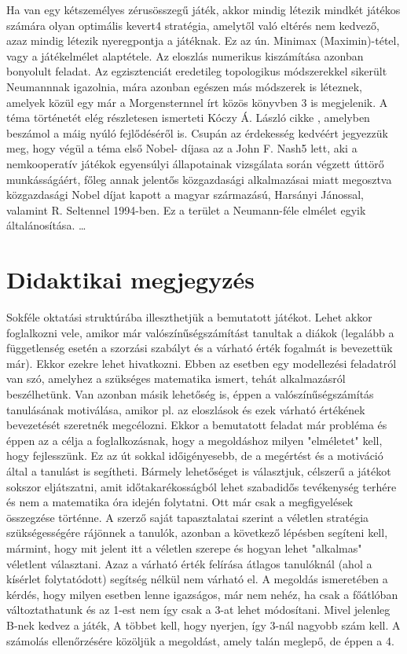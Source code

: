 \documentclass  {article}
\begin{document}
Ha van egy kétszemélyes zérusösszegű játék, akkor mindig létezik mindkét játékos számára olyan optimális kevert4 stratégia, amelytől való eltérés nem kedvező, azaz mindig létezik nyeregpontja a játéknak. Ez az ún. Minimax (Maximin)-tétel, vagy a játékelmélet alaptétele.
Az eloszlás numerikus kiszámítása azonban bonyolult feladat. Az egzisztenciát eredetileg topologikus módszerekkel sikerült Neumannnak igazolnia, mára azonban egészen más módszerek is léteznek, amelyek közül egy már a Morgensternnel írt közös könyvben 3 is megjelenik. A téma történetét elég részletesen ismerteti Kóczy Á. László cikke \cite{koczy} , amelyben beszámol a máig nyúló fejlődéséről is. Csupán az érdekesség kedvéért jegyezzük meg, hogy végül a téma első Nobel- díjasa az a John F. Nash5 lett, aki a nemkooperatív játékok egyensúlyi állapotainak  vizsgálata során végzett úttörő munkásságáért, főleg annak jelentős közgazdasági alkalmazásai miatt megosztva közgazdasági Nobel díjat kapott a magyar származású, Harsányi Jánossal, valamint R. Seltennel 1994-ben. Ez a terület a Neumann-féle elmélet egyik általánosítása.
…


\section{Didaktikai megjegyzés}

Sokféle oktatási struktúrába illeszthetjük a bemutatott játékot. Lehet akkor foglalkozni vele, amikor már valószínűségszámítást tanultak a diákok (legalább a függetlenség esetén a szorzási szabályt és a várható érték fogalmát is bevezettük már). Ekkor ezekre lehet hivatkozni. Ebben az esetben egy modellezési feladatról van szó, amelyhez a szükséges matematika ismert, tehát alkalmazásról beszélhetünk. Van azonban másik lehetőség is, éppen a valószínűségszámítás tanulásának motiválása, amikor pl. az eloszlások és ezek várható értékének bevezetését szeretnék megcélozni. Ekkor a bemutatott feladat már probléma és éppen az a célja a foglalkozásnak, hogy a megoldáshoz milyen "elméletet" kell, hogy fejlesszünk. Ez az út sokkal időigényesebb, de a megértést és a motiváció által a tanulást is segítheti. Bármely lehetőséget is választjuk, célszerű a játékot sokszor eljátszatni, amit időtakarékosságból lehet szabadidős tevékenység terhére és nem a matematika óra idején folytatni. Ott már csak a megfigyelések összegzése történne. A szerző saját tapasztalatai szerint a véletlen stratégia szükségességére rájönnek a tanulók, azonban a következő lépésben segíteni kell, mármint, hogy mit jelent itt a véletlen szerepe és hogyan lehet "alkalmas" véletlent választani. Azaz a várható érték felírása átlagos tanulóknál (ahol a kísérlet folytatódott) segítség nélkül nem várható el. A megoldás ismeretében a kérdés, hogy milyen esetben lenne igazságos, már nem nehéz, ha csak a főátlóban változtathatunk és az 1-est nem így csak a 3-at lehet módosítani. Mivel jelenleg B-nek kedvez a játék, A többet kell, hogy nyerjen, így 3-nál nagyobb szám kell. A számolás ellenőrzésére közöljük a megoldást, amely talán meglepő, de éppen a 4.  
\end{document}
